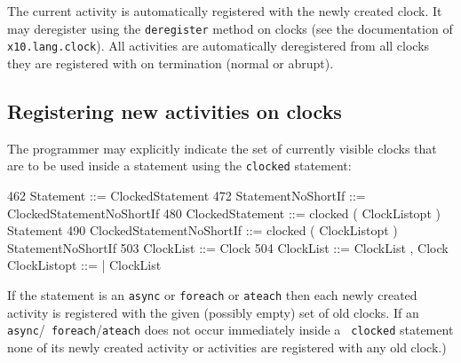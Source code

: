 The current activity is automatically registered with the newly
created clock.  It may deregister using the {\tt deregister} method on
clocks (see the documentation of {\tt x10.lang.clock}). All activities
are automatically deregistered from all clocks they are registered
with on termination (normal or abrupt).


\subsection{Registering new activities on clocks}
The programmer may explicitly indicate the set of currently visible
clocks that are to be used inside a statement using the
{\tt clocked} statement:

\begin{x10}
462 Statement ::= ClockedStatement
472 StatementNoShortIf ::= 
       ClockedStatementNoShortIf
480 ClockedStatement ::= 
       clocked ( ClockListopt ) 
         Statement
490 ClockedStatementNoShortIf ::= 
       clocked ( ClockListopt ) 
         StatementNoShortIf
503 ClockList ::= Clock
504 ClockList ::= ClockList , Clock
ClockListopt ::= 
   | ClockList
\end{x10}
If the statement is an {\tt async} or {\tt foreach} or {\tt ateach}
then each newly created activity is registered with the given
(possibly empty) set of old clocks. If an {\tt async}/{\tt
foreach}/{\tt ateach} does not occur immediately inside a {\tt
clocked} statement none of its newly created activity or activities
are registered with any old clock.)

